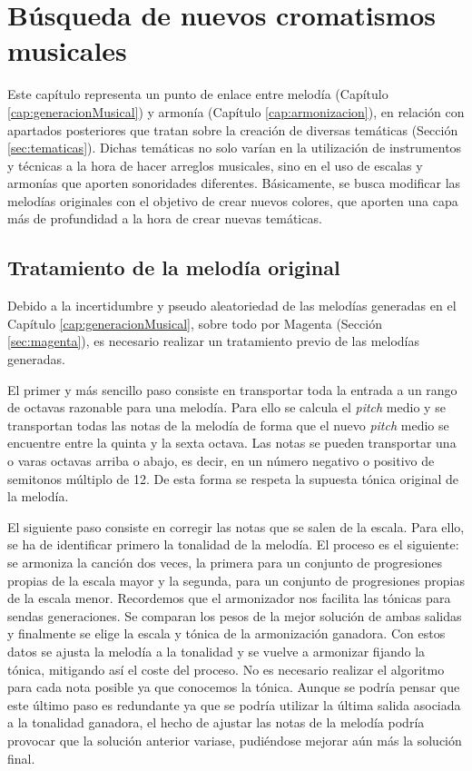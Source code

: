 \chapter{Búsqueda de nuevos cromatismos musicales}
\label{cap:nuevos_colores}

Este capítulo representa un punto de enlace entre melodía (Capítulo \ref{cap:generacionMusical}) y armonía (Capítulo \ref{cap:armonizacion}), en relación con apartados posteriores que tratan sobre la creación de diversas temáticas (Sección \ref{sec:tematicas}). Dichas temáticas no solo varían en la utilización de instrumentos y técnicas a la hora de hacer arreglos musicales, sino en el uso de escalas y armonías que aporten sonoridades diferentes. Básicamente, se busca modificar las melodías originales con el objetivo de crear nuevos colores, que aporten una capa más de profundidad a la hora de crear nuevas temáticas. 

\section{Tratamiento de la melodía original}

Debido a la incertidumbre y pseudo aleatoriedad de las melodías generadas en el Capítulo \ref{cap:generacionMusical}, sobre todo por Magenta (Sección \ref{sec:magenta}), es necesario realizar un tratamiento previo de las melodías generadas.

El primer y más sencillo paso consiste en transportar toda la entrada a un rango de octavas razonable para una melodía. Para ello se calcula el \textit{pitch} medio y se transportan todas las notas de la melodía de forma que el nuevo \textit{pitch} medio se encuentre entre la quinta y la sexta octava. Las notas se pueden transportar una o varas octavas arriba o abajo, es decir, en un número negativo o positivo de semitonos múltiplo de 12. De esta forma se respeta la supuesta tónica original de la melodía.

El siguiente paso consiste en corregir las notas que se salen de la escala. Para ello, se ha de identificar primero la tonalidad de la melodía. El proceso es el siguiente: se armoniza la canción dos veces, la primera para un conjunto de progresiones propias de la escala mayor y la segunda, para un conjunto de progresiones propias de la escala menor. Recordemos que el armonizador nos facilita las tónicas para sendas generaciones. Se comparan los pesos de la mejor solución de ambas salidas y finalmente se elige la escala y tónica de la armonización ganadora. Con estos datos se ajusta la melodía a la tonalidad y se vuelve a armonizar fijando la tónica, mitigando así el coste del proceso. No es necesario realizar el algoritmo para cada nota posible ya que conocemos la tónica. Aunque se podría pensar que este último paso es redundante ya que se podría utilizar la última salida asociada a la tonalidad ganadora, el hecho de ajustar las notas de la melodía podría provocar que la solución anterior variase, pudiéndose mejorar aún más la solución final.

